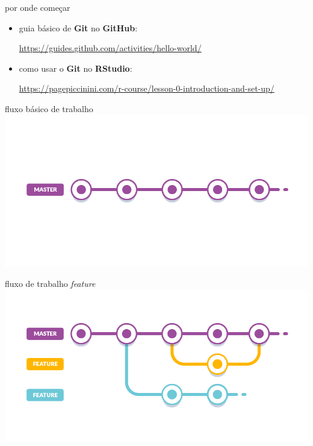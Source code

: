 \documentclass[11pt]{beamer}
\begin{document}
\begin{frame}{por onde começar}

\begin{itemize}
\item guia básico de \textbf{Git} no \textbf{GitHub}:

\subitem \href{https://guides.github.com/activities/hello-world/}{https://guides.github.com/activities/hello-world/}

\item como usar o \textbf{Git} no \textbf{RStudio}:

\subitem \href{https://pagepiccinini.com/r-course/lesson-0-introduction-and-set-up/}{https://pagepiccinini.com/r-course/lesson-0-introduction-and-set-up/}

\end{itemize}

\end{frame}

\begin{frame}{fluxo básico de trabalho}
\includegraphics[scale=.4]{basic.png}
\end{frame}

\begin{frame}{fluxo de trabalho \textit{feature}}
\includegraphics[scale=.4]{feature-branch.png}
\end{frame}
\end{document}
